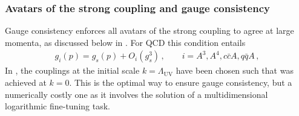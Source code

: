 \documentclass[aps,twocolumn,prd,superscriptaddress]{revtex4-2}
\begin{document}
\subsubsection{Avatars of the strong coupling and gauge consistency}
\label{sec:GaugeConsistency} 

Gauge consistency enforces all avatars of the strong coupling to agree at large momenta, as discussed below  in . For QCD this condition entails 
%
\begin{align}
g_{i}(p) = g_s(p)+O_i( g_s^3) \,,\qquad i= A^3,A^4,c\bar cA,q\bar q A\,, 
	\label{eq:AgreeAvatarsQCD}
\end{align}
%  
In \cite{Cyrol:2017ewj}, the couplings at the initial scale $k=\Lambda_\textrm{UV}$ have been chosen such that  was achieved at $k=0$. This is the optimal way to ensure gauge consistency, but a numerically costly one as it involves the solution of a multidimensional logarithmic fine-tuning task. 
\end{document}

